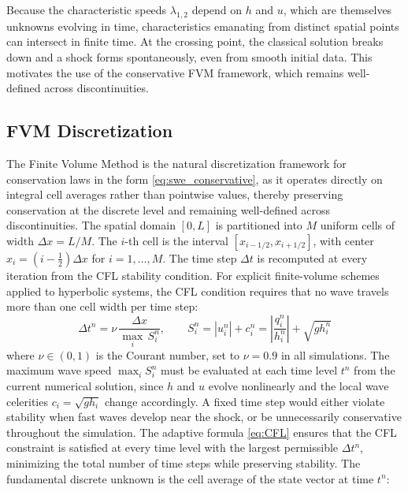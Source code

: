 \noindent Because the characteristic speeds $\lambda_{1,2}$ depend on $h$ and $u$, 
which are themselves unknowns evolving in time, characteristics emanating from 
distinct spatial points can intersect in finite time. At the crossing point, 
the classical solution breaks down and a shock forms spontaneously, 
even from smooth initial data. This motivates the use of the conservative FVM 
framework, which remains well-defined across discontinuities.

\subsection{FVM Discretization}
\label{ssc:312}

The Finite Volume Method is the natural discretization framework for conservation laws in the form \eqref{eq:swe_conservative}, as it operates directly on integral cell averages rather than pointwise values, thereby preserving conservation at the discrete level and remaining well-defined across discontinuities. The spatial domain \( [0, L] \) is partitioned into \( M \) uniform cells of width \( \Delta x = L/M \). The \( i \)-th cell is the interval \( [x_{i-1/2}, x_{i+1/2}] \), with center \( x_i = (i - \tfrac{1}{2})\Delta x \) for \( i = 1, \ldots, M \). 
The time step $\Delta t$ is recomputed at every iteration from the 
CFL stability condition. For explicit finite-volume schemes applied 
to hyperbolic systems, the CFL condition requires that no wave travels more 
than one cell width per time step:
%
\begin{equation}
    \Delta t^n = \nu \,\frac{\Delta x}{\displaystyle\max_{i}\, S_i^n},
    \qquad
    S_i^n = |u_i^n| + c_i^n = \left|\frac{q_i^n}{h_i^n}\right| + \sqrt{g h_i^n}
    \label{eq:CFL}
\end{equation}
%
where $\nu \in (0,1)$ is the Courant number, set to $\nu = 0.9$ in all 
simulations. The maximum wave speed $\max_i S_i^n$ must be evaluated at each 
time level $t^n$ from the current numerical solution, since $h$ and $u$ evolve 
nonlinearly and the local wave celerities $c_i = \sqrt{g h_i}$ change 
accordingly. A fixed time step would either violate stability when fast waves 
develop near the shock, or be unnecessarily conservative throughout the 
simulation. The adaptive formula \eqref{eq:CFL} ensures that the CFL constraint 
is satisfied at every time level with the largest permissible $\Delta t^n$, 
minimizing the total number of time steps while preserving stability.
The fundamental discrete unknown is the cell average of the state vector at time \( t^n \):

